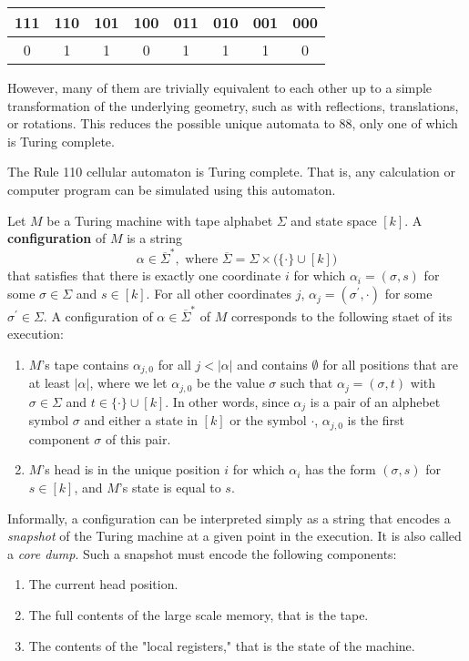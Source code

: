 \documentclass{article}
\begin{document}
  \begin{center}
  \begin{tabular}{c|c|c|c|c|c|c|c}
      111	&110	&101	&100	&011	&010	&001	&000 \\
      \hline
      0&1&1&0&1&1&1&0
  \end{tabular}
  \end{center}

  However, many of them are trivially equivalent to each other up to a simple transformation of the underlying geometry, such as with reflections, translations, or rotations. This reduces the possible unique automata to 88, only one of which is Turing complete. 

  \begin{theorem}
  The Rule 110 cellular automaton is Turing complete. That is, any calculation or computer program can be simulated using this automaton. 
  \end{theorem}

  \begin{definition}
  Let $M$ be a Turing machine with tape alphabet $\Sigma$ and state space $[k]$. A \textbf{configuration} of $M$ is a string 
  \[\alpha \in \overline{\Sigma}^*, \text{ where } \overline{\Sigma} = \Sigma \times \big( \{ \cdot \} \cup [k] \big)\]
  that satisfies that there is exactly one coordinate $i$ for which $\alpha_i = (\sigma, s)$ for some $\sigma \in \Sigma$ and $s \in [k]$. For all other coordinates $j$, $\alpha_j = (\sigma^\prime, \cdot)$ for some $\sigma^\prime \in \Sigma$. A configuration of $\alpha \in \overline{\Sigma}^*$ of $M$ corresponds to the following staet of its execution: 
  \begin{enumerate}
      \item $M$'s tape contains $\alpha_{j, 0}$ for all $j < |\alpha|$ and contains $\emptyset$ for all positions that are at least $|\alpha|$, where we let $\alpha_{j, 0}$ be the value $\sigma$ such that $\alpha_j = (\sigma, t)$ with $\sigma \in \Sigma$ and $t \in \{\cdot\} \cup [k]$. In other words, since $\alpha_j$ is a pair of an alphebet symbol $\sigma$ and either a state in $[k]$ or the symbol $\cdot$, $\alpha_{j, 0}$ is the first component $\sigma$ of this pair. 
      \item $M$'s head is in the unique position $i$ for which $\alpha_i$ has the form $(\sigma, s)$ for $s \in [k]$, and $M$'s state is equal to $s$. 
  \end{enumerate}
  Informally, a configuration can be interpreted simply as a string that encodes a \textit{snapshot} of the Turing machine at a given point in the execution. It is also called a \textit{core dump}. Such a snapshot must encode the following components: 
  \begin{enumerate}
      \item The current head position. 
      \item The full contents of the large scale memory, that is the tape. 
      \item The contents of the "local registers," that is the state of the machine. 
  \end{enumerate}
  \end{definition}
\end{document}
